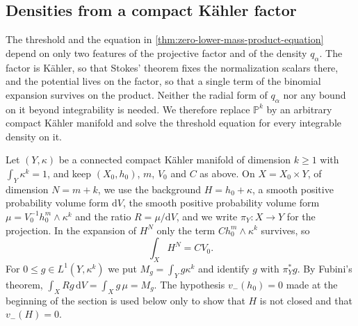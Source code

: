 \subsection{Densities from a compact K\"ahler factor}
\label{subsec:closed-factor-product-densities}

The threshold and the equation in \cref{thm:zero-lower-mass-product-equation} depend on only two features of the projective factor and of the density $q_\alpha$. The factor is K\"ahler, so that Stokes' theorem fixes the normalization scalars there, and the potential lives on the factor, so that a single term of the binomial expansion survives on the product. Neither the radial form of $q_\alpha$ nor any bound on it beyond integrability is needed. We therefore replace $\mathbb P^k$ by an arbitrary compact K\"ahler manifold and solve the threshold equation for every integrable density on it.

Let $(Y,\kappa)$ be a connected compact K\"ahler manifold of dimension $k\geq1$ with $\int_Y\kappa^k=1$, and keep $(X_0,h_0)$, $m$, $V_0$ and $C$ as above. On $X=X_0\times Y$, of dimension $N=m+k$, we use the background $H=h_0+\kappa$, a smooth positive probability volume form $\mathrm{d}V$, the smooth positive probability volume form $\mu=V_0^{-1}h_0^m\wedge\kappa^k$ and the ratio $R=\mu/\mathrm{d}V$, and we write $\pi_Y\colon X\to Y$ for the projection. In the expansion of $H^N$ only the term $Ch_0^m\wedge\kappa^k$ survives, so
\[
 \int_XH^N=CV_0.
\]
For $0\leq g\in L^1(Y,\kappa^k)$ we put $M_g=\int_Yg\kappa^k$ and identify $g$ with $\pi_Y^*g$. By Fubini's theorem, $\int_XRg\,\mathrm{d}V=\int_Xg\,\mu=M_g$. The hypothesis $v_-(h_0)=0$ made at the beginning of the section is used below only to show that $H$ is not closed and that $v_-(H)=0$.

